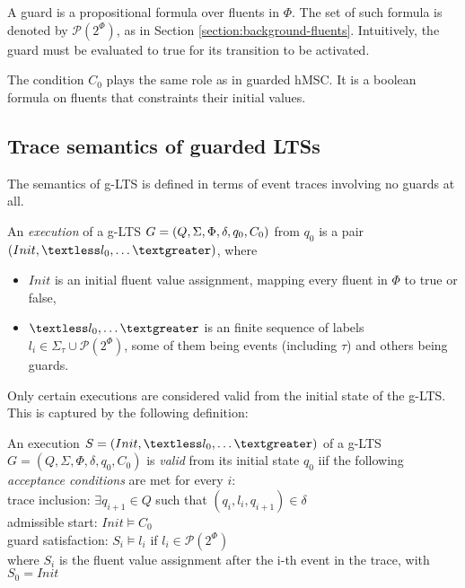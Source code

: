A guard is a propositional formula over fluents in $\Phi$. The set of such formula is denoted by $\mathcal{P}(2^\Phi)$, as in Section \ref{section:background-fluents}. Intuitively, the guard must be evaluated to true for its transition to be activated.

The condition $C_0$ plays the same role as in guarded hMSC. It is a boolean formula on fluents that constraints their initial values.

\subsection{Trace semantics of guarded LTSs} 

The semantics of g-LTS is defined in terms of event traces involving no guards at all. 

\begin{definition}
An \emph{execution} of a g-LTS $G = (Q,\Sigma,\Phi,\\\delta,q_{0},C_{0})$ from $q_0$ is a pair $(Init, \textless l_0, \ldots \textgreater)$, where 
\begin{itemize}
\item $Init$ is an initial fluent value assignment, mapping every fluent in $\Phi$ to true or false,
\item $\textless l_0, \ldots \textgreater$ is an finite sequence of labels $l_i \in \Sigma_{\tau}\cup\mathcal{P}(2^\Phi)$, some of them being events (including $\tau$) and others being guards.
\end{itemize}
\end{definition}

Only certain executions are considered valid from the initial state of the g-LTS. This is captured by the following definition:

\begin{definition}
An execution $S = (Init,\textless l_0,\ldots \textgreater)$ of a g-LTS $G = (Q,\Sigma,\Phi,\delta,q_{0},C_{0})$ is \emph{valid} from its initial state $q_0$ iif the following \emph{acceptance conditions} are met for every $i$:\\
\indent trace inclusion: $\exists q_{i+1} \in Q$ such that $(q_i,l_i,q_{i+1}) \in \delta$\\
\indent admissible start: $Init \models C_0$ \\
\indent guard satisfaction: $S_i \models l_i$ if $l_i \in \mathcal{P}(2^\Phi)$\\
where $S_i$ is the fluent value assignment after the i-th event in the trace, with $S_0 = Init$
\end{definition}

